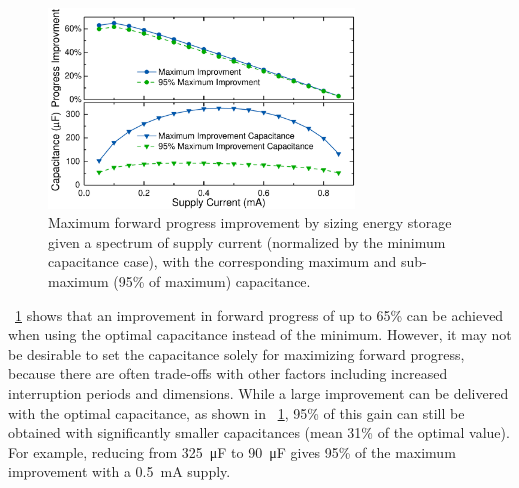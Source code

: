 \begin{figure}[!t]
  \centering
  \includegraphics[width=3.2in]{ch3_sizingeffect/figures/StorCCurMax4Fig}
  \caption{Maximum forward progress improvement by sizing energy storage given a spectrum of supply current (normalized by the minimum capacitance case), with the corresponding maximum and sub-maximum (95\% of maximum) capacitance. }
  \label{fig:maxfwp}
\end{figure}

\figurename{~\ref{fig:maxfwp}} shows that an improvement in forward progress of up to 65\%  can be achieved when using the optimal capacitance instead of the minimum. However, it may not be desirable to set the capacitance solely for maximizing forward progress, because there are often trade-offs with other factors including increased interruption periods and dimensions. 
While a large improvement can be delivered with the optimal capacitance, as shown in \figurename{~\ref{fig:maxfwp}}, 95\% of this gain can still be obtained with significantly smaller capacitances (mean 31\% of the optimal value).
For example, reducing from \SI{325}{\micro\farad} to \SI{90}{\micro\farad} gives 95\% of the maximum improvement with a \SI{0.5}{\milli\ampere} supply. 


